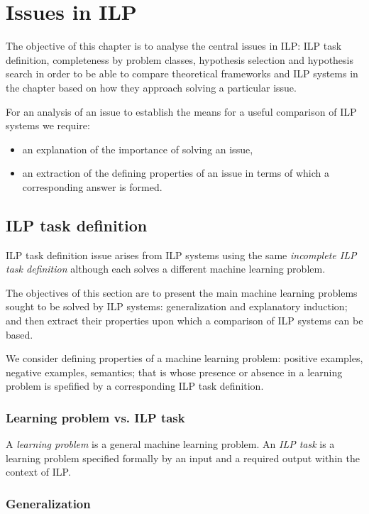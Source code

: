 \chapter{Issues in ILP}\label{chap:issues_in_ilp}
The objective of this chapter is to analyse the central issues in ILP: ILP task definition, completeness by problem classes, hypothesis selection and hypothesis search in order to be able to compare theoretical frameworks and ILP systems in the chapter  based on how they approach solving a particular issue.

For an analysis of an issue to establish the means for a useful comparison of ILP systems we require:
\begin{itemize}
\item an explanation of the importance of solving an issue,
\item an extraction of the defining properties of an issue in terms of which a corresponding answer is formed.
\end{itemize}

\section{ILP task definition}\label{sec:ilp_task_definition}
ILP task definition issue arises from ILP systems using the same \emph{incomplete ILP task definition} although each solves a different machine learning problem.

The objectives of this section are to present the main machine learning problems sought to be solved by ILP systems: generalization and explanatory induction; and then extract their properties upon which a comparison of ILP systems can be based.

We consider defining properties of a machine learning problem: positive examples, negative examples, semantics; that is whose presence or absence in a learning problem is spefified by a corresponding ILP task definition.

\subsection{Learning problem vs. ILP task}
A \emph{learning problem} is a general machine learning problem. An \emph{ILP task} is a learning problem specified formally by an input and a required output within the context of ILP.

\subsection{Generalization}


